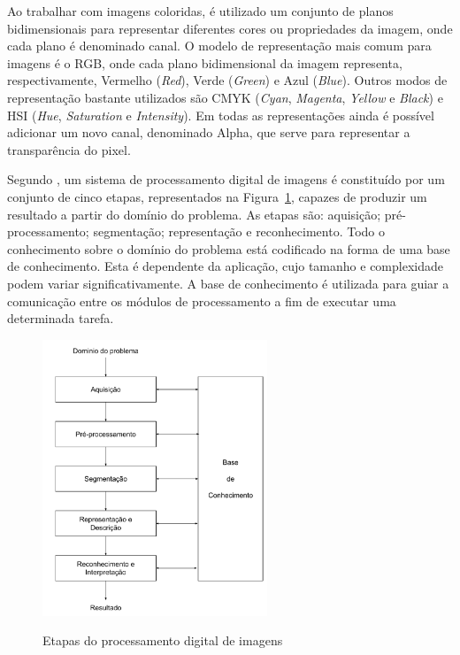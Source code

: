 \documentclass[12pt,oneside,a4paper,english,french,spanish,brazil,]{abntex2}
\begin{document}
Ao trabalhar com imagens coloridas, é utilizado um conjunto de planos bidimensionais para representar diferentes cores ou propriedades da imagem, onde cada plano é denominado canal. O modelo de representação mais comum para imagens é o RGB, onde cada plano bidimensional da imagem representa, respectivamente, Vermelho (\textit{Red}), Verde (\textit{Green}) e Azul (\textit{Blue}). Outros modos de representação bastante utilizados são CMYK (\textit{Cyan}, \textit{Magenta}, \textit{Yellow} e \textit{Black}) e HSI (\textit{Hue}, \textit{Saturation} e \textit{Intensity}). Em todas as representações ainda é possível adicionar um novo canal, denominado Alpha, que serve para representar a transparência do pixel.

Segundo \citet{pedrini:2008}, um sistema de processamento digital de imagens é constituído por um conjunto de cinco etapas, representados na Figura~\ref{fig:PDI_Etapas_PDI}, capazes de produzir um resultado a partir do domínio do problema. As etapas são: aquisição; pré-processamento; segmentação; representação e reconhecimento. Todo o conhecimento sobre o domínio do problema está codificado na forma de uma base de conhecimento. Esta é dependente da aplicação, cujo tamanho e complexidade podem variar significativamente. A base de conhecimento é utilizada para guiar a comunicação entre os módulos de processamento a fim de executar uma determinada tarefa.

\begin{figure}[ht]
\centering
\caption{Etapas do processamento digital de imagens}
\includegraphics[width=0.6\textwidth]{imagens/PDI_Etapas_PDI.pdf}
\label{fig:PDI_Etapas_PDI}
\end{figure}
\end{document}
